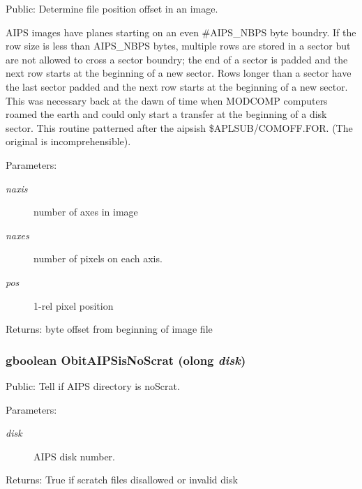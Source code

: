 Public: Determine file position offset in an image. 

AIPS images have planes starting on an even \#AIPS\_\-NBPS byte boundry. If the row size is less than AIPS\_\-NBPS bytes, multiple rows are stored in a sector but are not allowed to cross a sector boundry; the end of a sector is padded and the next row starts at the beginning of a new sector. Rows longer than a sector have the last sector padded and the next row starts at the beginning of a new sector. This was necessary back at the dawn of time when MODCOMP computers roamed the earth and could only start a transfer at the beginning of a disk sector. This routine patterned after the aipsish \$APLSUB/COMOFF.FOR. (The original is incomprehensible). \begin{Desc}
\item[Parameters:]
\begin{description}
\item[{\em naxis}]number of axes in image \item[{\em naxes}]number of pixels on each axis. \item[{\em pos}]1-rel pixel position \end{description}
\end{Desc}
\begin{Desc}
\item[Returns:]byte offset from beginning of image file \end{Desc}
\subsubsection{\setlength{\rightskip}{0pt plus 5cm}gboolean Obit\-AIPSis\-No\-Scrat ({\bf olong} {\em disk})}\label{ObitAIPS_8c_a22}


Public: Tell if AIPS directory is no\-Scrat. 

\begin{Desc}
\item[Parameters:]
\begin{description}
\item[{\em disk}]AIPS disk number. \end{description}
\end{Desc}
\begin{Desc}
\item[Returns:]True if scratch files disallowed or invalid disk \end{Desc}
